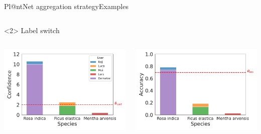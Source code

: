 \begin{frame}{Pl@ntNet aggregation strategy}{Examples}
\begin{onlyenv}
\begin{columns}
\begin{column}{.5\textwidth}
\begin{center}
                \end{center}
            \end{column}
        \end{columns}
    \end{onlyenv}
    \begin{onlyenv}<2>
        Label switch\phantom{g}
        \begin{columns}
            \begin{column}{.5\textwidth}
                \begin{center}
                    \includegraphics[width=\textwidth]{./images/histplot_conf_switch.pdf}
                \end{center}
            \end{column}
            \begin{column}{.5\textwidth}
                \begin{center}
                    \includegraphics[width=\textwidth]{./images/histplot_acc_switch.pdf}

\end{center}
\end{column}
\end{columns}
\end{onlyenv}
\end{frame}

